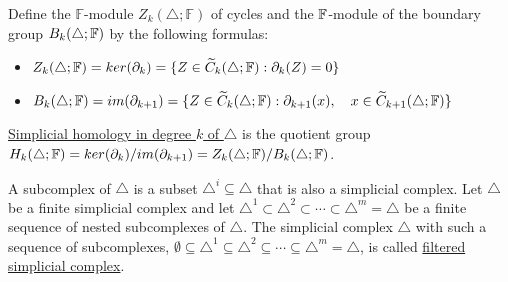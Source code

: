 \documentclass[9pt,conference]{IEEEtran}
\begin{document}
\begin{defn}
\label{kth-homology-group}
Define the $\mathbb{F}$-module $Z_k(\triangle; \mathbb{F})$ of cycles and the $\mathbb{F}$-module of the boundary group $B_k(\triangle;\mathbb{F})$ by the following formulas:
    \begin{itemize}
        \item $Z_k(\triangle; \mathbb{F}) = ker(\partial_k) = \{Z \in \widetilde{C}_k(\triangle; \mathbb{F}): \partial_k(Z) = 0\}$ 
        \item $B_k(\triangle;\mathbb{F}) = im(\partial_{k+1}) = \{Z \in \widetilde{C}_k(\triangle; \mathbb{F}): \partial_{k+1}(x), \quad x \in \widetilde{C}_{k+1}(\triangle; \mathbb{F})\}$ 
    \end{itemize}
  \underline{Simplicial homology in degree $k$ of $\triangle$} is the quotient group $H_k(\triangle;\mathbb{F}) = ker(\partial_k) / im(\partial_{k+1}) = Z_k(\triangle;\mathbb{F}) / B_k(\triangle;\mathbb{F})$.

\end{defn}

\begin{defn}
\label{filtered}
A subcomplex of $\triangle$ is a subset $\triangle^i \subseteq \triangle$ that is also a simplicial complex. 
Let $\triangle$ be a finite simplicial complex and let $\triangle^1 \subset \triangle^2 \subset \cdots \subset \triangle^m = \triangle$ be a finite sequence of nested subcomplexes of $\triangle$. The simplicial complex $\triangle$ with such a sequence of subcomplexes, $\emptyset \subseteq \triangle^1 \subseteq \triangle^2 \subseteq \cdots \subseteq \triangle^m = \triangle$, is called \underline{filtered simplicial complex}.

\end{defn}
\end{document}
